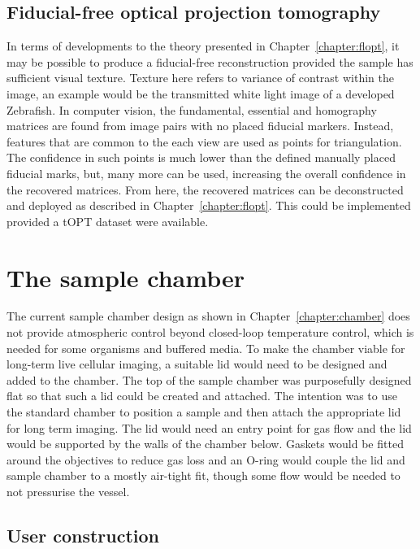\subsection{Fiducial-free optical projection tomography}

In terms of developments to the theory presented in Chapter~\ref{chapter:flopt}, it may be possible to produce a fiducial-free reconstruction provided the sample has sufficient visual texture.
Texture here refers to variance of contrast within the image, an example would be the transmitted white light image of a developed Zebrafish.
In computer vision, the fundamental, essential and homography matrices are found from image pairs with no placed fiducial markers.
Instead, features that are common to the each view are used as points for triangulation.
The confidence in such points is much lower than the defined manually placed fiducial marks, but, many more can be used, increasing the overall confidence in the recovered matrices.
From here, the recovered matrices can be deconstructed and deployed as described in Chapter~\ref{chapter:flopt}.
This could be implemented provided a \gls{tOPT} dataset were available.

\section{The sample chamber}

The current sample chamber design as shown in Chapter~\ref{chapter:chamber} does not provide atmospheric control beyond closed-loop temperature control, which is needed for some organisms and  buffered media.
To make the chamber viable for long-term live cellular imaging, a suitable lid would need to be designed and added to the chamber.
The top of the sample chamber was purposefully designed flat so that such a lid could be created and attached.
The intention was to use the standard chamber to position a sample and then attach the appropriate lid for long term imaging.
The lid would need an entry point for gas flow and the lid would be supported by the walls of the chamber below.
Gaskets would be fitted around the objectives to reduce gas loss and an O-ring would couple the lid and sample chamber to a mostly air-tight fit, though some flow would be needed to not pressurise the vessel.

\subsection{User construction}

